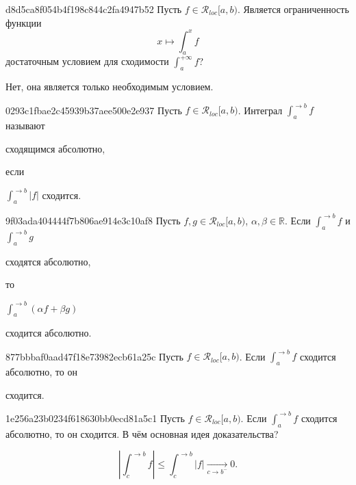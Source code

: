 \begin{note}{d8d5ca8f054b4f198c844c2fa4947b52}
    Пусть \({ f \in \mathcal R_{loc}[a, b) }\).
    Является ограниченность функции
    \[
        x \mapsto \int_{a}^{x} f
    \]
    достаточным условием для сходимости \({ \int_{a}^{+\infty} f }\)?

    \begin{cloze}{1}
        Нет, она является только необходимым условием.
    \end{cloze}
\end{note}

\begin{note}{0293c1fbae2c45939b37aee500e2e937}
    Пусть \({ f \in \mathcal R_{loc}[a, b) }\).
    Интеграл \({ \int_{a}^{\to b} f }\) называют \begin{icloze}{2}сходящимся абсолютно,\end{icloze} если \begin{icloze}{1}\({ \int_{a}^{\to b} \left\lvert f \right\rvert }\) сходится.\end{icloze}
\end{note}

\begin{note}{9f03ada404444f7b806ae914e3c10af8}
    Пусть \({ f, g \in \mathcal R_{loc}[a, b) }\), \({ \alpha, \beta \in \mathbb R }\).
    Если \({ \int_{a}^{\to b} f }\) и \({ \int_{a}^{\to b} g }\) \begin{icloze}{2}сходятся абсолютно,\end{icloze} то \begin{icloze}{3}\({ \int_{a}^{\to b} (\alpha f + \beta g) }\)\end{icloze} \begin{icloze}{1}сходится абсолютно.\end{icloze}
\end{note}

\begin{note}{877bbbaf0aad47f18e73982ecb61a25c}
    Пусть \({ f \in \mathcal R_{loc}[a, b) }\).
    Если \({ \int_{a}^{\to b} f }\) сходится абсолютно, то он \begin{icloze}{1}сходится.\end{icloze}
\end{note}

\begin{note}{1e256a23b0234f618630bb0ecd81a5c1}
    Пусть \({ f \in \mathcal R_{loc}[a, b) }\).
    Если \({ \int_{a}^{\to b} f }\) сходится абсолютно, то он сходится.
    В чём основная идея доказательства?

    \begin{cloze}{1}
        \[
            \left\lvert \int_{c}^{\to b} f \right\rvert \leqslant \int_{c}^{\to b} \left\lvert f \right\rvert \underset{c \to b^{-}}\longrightarrow 0.
        \]
    \end{cloze}
\end{note}

